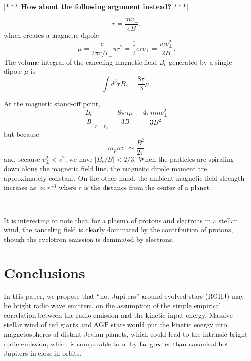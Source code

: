 \documentclass{emulateapj}
\def\memoYF#1{\color{red}$[${\bf #1}$]$ \color{black}}
\begin{document}
\memoYF{$\ast \ast \ast$ How about the following argument instead? $\ast \ast \ast$}

\begin{equation}
r=\frac{mv_{\bot }}{eB}.
\end{equation}
which creates a magnetic dipole
\begin{equation}
\mu = \frac{e}{2\pi r/v_{\bot }} \pi r^2 = \frac{1}{2} e r v_{\bot } = \frac{mv_{\bot }^2}{2B}.
\end{equation}
The volume integral of the canceling magnetic field $B_c$ generated by a single dipole $\mu$ is
\begin{equation}
\int d^3{\boldsymbol r} B_c = \frac{8\pi}{3} \mu.
\end{equation}

At the magnetic stand-off point, 
\begin{equation}
\left. \frac{B_c}{B}\right|_{r=r_s} = \frac{8\pi n \mu}{3B} = \frac{4\pi nmv_{\bot }^2}{3 B^2}
\end{equation}
but because
\begin{equation}
m_p n v^2 \sim \frac{B^2}{2\pi }
\end{equation}
and because $v_{\bot }^2 < v^2$, we have $|B_c/B| < 2/3$. 
When the particles are spiraling down along the magnetic field line, the magnetic dipole moment are approximately constant. 
On the other hand, the ambient magnetic field strength increase as $\propto r^{-3}$ where $r$ is the distance from the center of a planet. 


---


It is interesting to note that, for a plasma of protons and electrons in a stellar wind, the canceling field is clearly dominated by the contribution of protons, though the cyclotron emission is dominated by electrons. 


\section{Conclusions}
\label{sec:conc}

In this paper, we propose that ``hot Jupiters'' around evolved stars (RGHJ) may be bright radio wave emitters, on the assumption of the simple empirical correlation between the radio emission and the kinetic input energy. 
Massive stellar wind of red giants and AGB stars would put the kinetic energy into magnetospheres of distant Jovian planets, which could lead to the intrinsic bright radio emission, which is comparable to or by far greater than canonical hot Jupiters in close-in orbits. 
\end{document}
